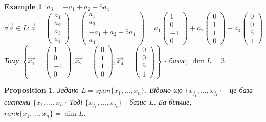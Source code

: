 \documentclass[a4paper, 10pt]{article}
\theoremstyle{theoremdd}
\newtheorem{example}[theorem]{Example}
\newtheorem{proposition}[theorem]{Proposition}
\begin{document}
\begin{example}
	$a_3 = -a_1 + a_2 + 5a_4$\\
	$\forall \vec{a} \in L: \vec{a} = \begin{pmatrix} a_1 \\ a_2 \\ a_3 \\ a_4 \end{pmatrix} = \begin{pmatrix} a_1 \\ a_2 \\ -a_1 + a_2 + 5a_4 \\ a_4 \end{pmatrix} = a_1 \begin{pmatrix} 1 \\ 0 \\ -1 \\ 0 \end{pmatrix} + a_2 \begin{pmatrix} 0 \\ 1 \\ 1 \\ 0 \end{pmatrix} + a_4 \begin{pmatrix} 0 \\ 0 \\ 5 \\ 1 \end{pmatrix}$\\
	Тому $\left\{\vec{x_1} = \begin{pmatrix} 1 \\ 0 \\ -1 \\ 0\end{pmatrix}, \vec{x_2} = \begin{pmatrix} 0 \\ 1 \\ 1 \\ 0\end{pmatrix}, \vec{x_4} = \begin{pmatrix} 0 \\ 0 \\ 5 \\ 1\end{pmatrix} \right\}$ - базис, $\dim{L} = 3$.
	\end{example}
	
	\iffalse
	\begin{proposition}
	Задано $L = span\{x_1,\dots,x_n\}$. Відомо що $\{x_{j_1},\dots,x_{j_k}\}$ - це база системи $\{x_1,\dots,x_n\}$ Тоді $\{x_{j_1},\dots,x_{j_k}\}$ - базис $L$. Ба більше, $rank\{x_1,\dots,x_n\} = \dim L$.
	\end{proposition}
	
\end{document}
